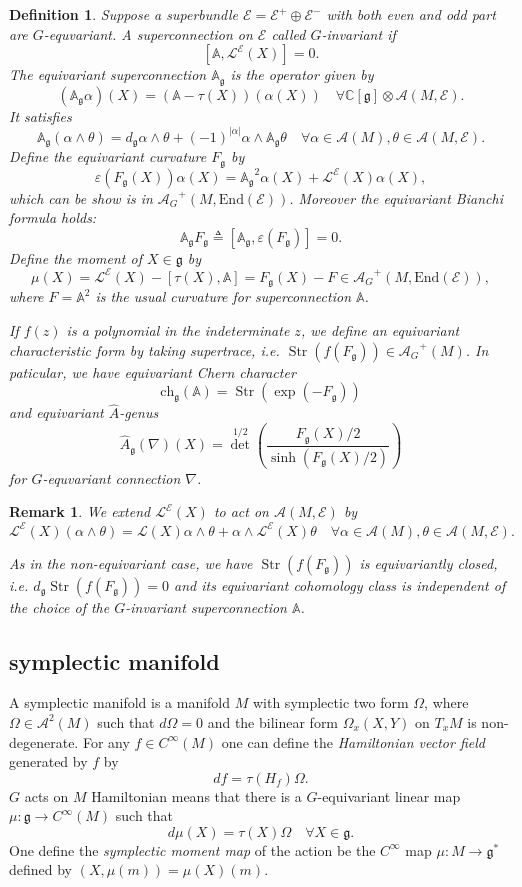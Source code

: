 \documentclass[11pt]{amsart}
\newtheorem{Def}[Thm]{Definition}
\newtheorem{Rmk}[Thm]{Remark}
\def\cA{{\mathcal{A}}}
\def\cAg{{\mathcal{A}_G}}
\def\cL{{\mathcal{L}}}
\def\cLE{\cL^\cE}
\def\cE{{\mathcal{E}}}
\def\bC{{\mathbb{C}}}
\def\bA{{\mathbb{A}}}
\def\bAg{{\mathbb{A}_\mathfrak{g}}}
\def\Fg{{F_{\fgg}}}
\def\fgg{{\mathfrak{g}}}
\def\dg{{d_{\fgg}}}
\def\End{{\mathrm{End}}}
\def\Str{\mathop{\mathrm{Str}}}
\def\kw#1{{\em #1}}
\def\ch{\mathrm{ch}}
\def\Ah{{\hat{A}}}
\def\chg{\ch_\fgg}
\def\Ahg{\Ah_\fgg}
\begin{document}
\begin{Def}
Suppose a superbundle $\cE = \cE^+\oplus \cE^-$ 
with both even and odd part are $G$-equvariant.
A superconnection on $\cE$ called $G$-invariant if 
\[
[\bA,\cL^\cE(X)]=0.
\]
The equivariant superconnection $\bAg$ is the operator given by 
\[
(\bAg \alpha)(X) = (\bA-\tau(X))(\alpha(X)) \quad \forall  \bC[\fgg]\otimes \cA(M,\cE).
\]
It satisfies \[
\bAg(\alpha\wedge \theta) = \dg \alpha \wedge \theta +
(-1)^{|\alpha|}\alpha\wedge \bAg\theta \quad \forall\alpha \in \cA(M),
\theta \in \cA(M,\cE).
\]
Define the \kw{equivariant curvature} $\Fg$ by
\[
\varepsilon(\Fg(X))\alpha(X) = \bAg^2\alpha(X) + \cL^\cE(X)\alpha(X),
\] 
which can be show is in $\cAg^+(M,\End(\cE))$.
Moreover the \kw{equivariant Bianchi formula} holds:
\[
\bAg\Fg \triangleq [\bAg,\varepsilon(\Fg)] = 0.
\]
Define the \kw{moment} of $X\in \fgg$ by 
\[
\mu(X) = \cLE(X) - [\tau(X),\bA] = \Fg(X) - F \in \cAg^+(M,\End(\cE)),
\]
where $F = \bA^2$ is the usual curvature for superconnection $\bA$.

If $f(z)$ is a polynomial in the indeterminate $z$, we define an
\kw{equivariant characteristic form} by taking supertrace,
i.e. $\Str(f(\Fg)) \in \cAg^+(M)$. In paticular, we have
\kw{equivariant Chern character} 
\[\chg(\bA) = \Str(\exp(-\Fg))
\]
 and
\kw{equivariant $\Ah$-genus} 
\[
\Ahg(\nabla)(X) =
{\det}^{1/2}\left(\frac{\Fg(X)/2}{\sinh(\Fg(X)/2)}\right)
\]
for $G$-equvariant connection $\nabla$.
\end{Def}

\begin{Rmk}
We extend $\cL^\cE(X)$ to act on $\cA(M,\cE)$ by 
\[
\cLE(X)(\alpha\wedge \theta) =\cL(X) \alpha \wedge \theta +\alpha
\wedge \cLE(X)\theta \quad \forall \alpha\in \cA(M), \theta\in \cA(M,\cE).
\]

As in the non-equivariant case, we have $\Str(f(\Fg))$ is
equivariantly closed, i.e. $\dg \Str(f(\Fg)) = 0$ and its equivariant
cohomology class is independent of the choice of the $G$-invariant
superconnection $\bA$.
\end{Rmk}


\subsection{symplectic manifold}
A symplectic manifold is a manifold $M$ with symplectic two form
$\Omega$, where $\Omega\in \cA^2(M)$ such that $d\Omega=0$ and
the bilinear form $\Omega_x(X,Y)$ on $T_xM$ is non-degenerate.
For any $f\in C^\infty(M)$ one can define the \kw{Hamiltonian vector
  field} generated by $f$ by 
\[
df = \tau(H_f)\Omega.
\] 
$G$ acts on $M$ Hamiltonian means that there is a $G$-equivariant linear
map $\mu:\fgg\to C^\infty(M)$ such that 
\[
d\mu(X) = \tau(X) \Omega \quad \forall X\in \fgg.
\]
One define the \kw{symplectic moment map} of the action be the
$C^\infty$ map $\mu\colon M\to \fgg^*$ defined by $(X,\mu(m)) =
\mu(X)(m)$.
\end{document}
